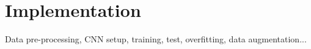 \section{Implementation}

Data pre-processing, CNN setup, training, test, overfitting, data augmentation...
